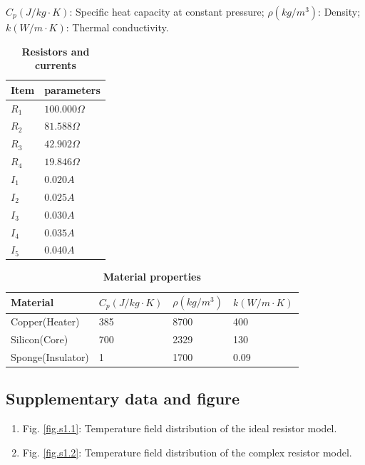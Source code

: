 \documentclass[12pt,a4paper,UTF8]{article}
\begin{document}
    $C_p (J/kg\cdot K)$: Specific heat capacity at constant pressure; $\rho (kg/m^3)$: Density; $k (W/m\cdot K)$: Thermal conductivity.
    
    \begin{table}[htbp]
        \centering
        \caption{\textbf{Resistors and currents}}
        \label{tab.s1.1}
            \begin{tabular}{ll}
                \toprule
                Item &parameters  \\
                \midrule
                $R_1$ & $100.000\Omega$  \\
                $R_2$ & $81.588\Omega$  \\
                $R_3$ & $42.902\Omega$  \\
                $R_4$ & $19.846\Omega$  \\
                $I_1$ & $0.020A$  \\
                $I_2$ & $0.025A$  \\
                $I_3$ & $0.030A$  \\
                $I_4$ & $0.035A$  \\
                $I_5$ & $0.040A$  \\
                \bottomrule
            \end{tabular}
    \end{table}	

    \begin{table}[htbp]
        \centering
        \caption{\textbf{Material properties}}
        \label{tab.s1.2}
            \begin{tabular}{llll}
                \toprule
                Material &$C_p (J/kg\cdot K)$    &$\rho (kg/m^3)$   &$k (W/m\cdot K)$  \\
                \midrule
                Copper(Heater) &385    &8700    &400  \\
                Silicon(Core) &700    &2329   &130  \\
                Sponge(Insulator) &1    &1700    &0.09  \\
                \bottomrule
            \end{tabular}
    \end{table}	


    \subsection{Supplementary data and figure}
    \begin{enumerate}[label=\arabic*.]
        \item Fig. \ref{fig.s1.1}: Temperature field distribution of the ideal resistor model.
        \item Fig. \ref{fig.s1.2}: Temperature field distribution of the complex resistor model.
    \end{enumerate}
	
\end{document}
